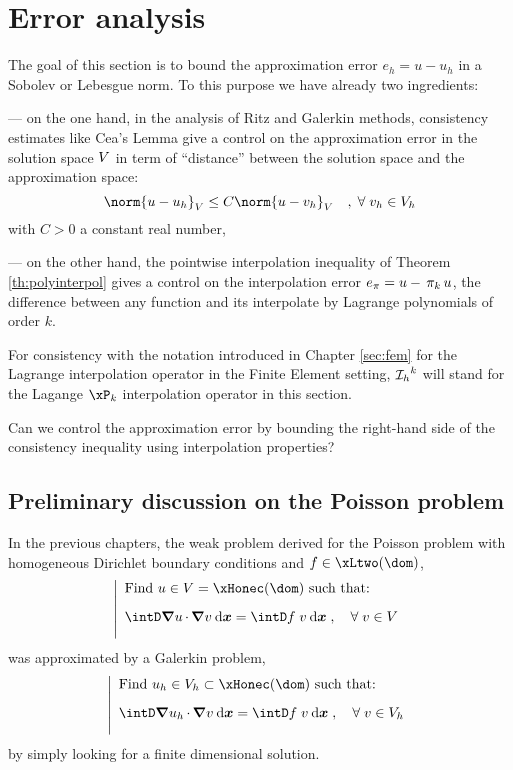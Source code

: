 
\chapter{Error analysis}\label{chap:ea}

The goal of this section is to bound the approximation error $e_h = u - u_h$ in a Sobolev or Lebesgue norm.
To this purpose we have already two ingredients:

--- on the one hand, in the analysis of Ritz and Galerkin methods, consistency estimates like Cea's Lemma give a control on the approximation error in the solution space ${V}$ in term of ``distance'' between the solution space and the approximation space:
\begin{equation*}
\norm{u - u_h}_\xV  \leq C \norm{u - v_h}_\xV\quad,\; \forany v_h \in \xVh
\end{equation*}
with $C > 0$ a constant real number,

--- on the other hand, the pointwise interpolation inequality of Theorem \eqref{th:polyinterpol} gives a control on the interpolation error $e_{\pi} = u - \,\mathrm{\pi}_{k}\, u$, \ie the difference between any function and its interpolate by Lagrange polynomials of order $k$.

\medskip
For consistency with the notation introduced in Chapter \ref{sec:fem} for the Lagrange interpolation operator in the Finite Element setting, $\mathop{\mathcal{I}_{h}}^k$ will stand for the Lagange $\xP_k$ interpolation operator in this section.

\medskip
\Question Can we control the approximation error by bounding the right-hand side of the consistency inequality using interpolation properties?

\section{Preliminary discussion on the Poisson problem}

In the previous chapters, the weak problem derived for the Poisson problem with homogeneous Dirichlet boundary conditions and $f\in\xLtwo(\dom)$,
\begin{equation*}
\left\lvert
\begin{array}{ll}
\mbox{Find $u\in \xV = \xHonec(\dom)$ such that:}\\[2ex]
\displaystyle\intD \Grad{u}\xDot\Grad{v} \dxx = \intD f\;v \dxx\;,\quad\forany v \in\xV\\[2ex]
\end{array}
\right.
\end{equation*}
was approximated by a Galerkin problem,
\begin{equation*}
\left\lvert
\begin{array}{ll}
\mbox{Find $u_h\in\xVh\subset\xHonec(\dom)$ such that:}\\[2ex]
\displaystyle\intD \Grad{u_h}\xDot\Grad{v} \dxx = \intD f\;v \dxx\;,\quad\forany v \in\xVh\\[2ex]
\end{array}
\right.
\end{equation*}
by simply looking for a finite dimensional solution.

